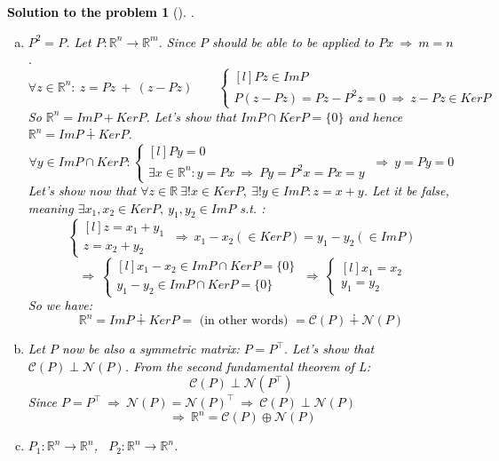 \documentclass[12pt,a4]{article}
\newtheorem{solution}{Solution to the problem}
\newcommand{\bR}{{\mathbb R}}
\renewcommand{\Im}{{\mathcal C}}
\newcommand{\Ker}{{\mathcal N}}
\begin{document}
\textcolor{black}{
\begin{solution}[]\rm .
\begin{enumerate}[(a)]
	\item $P^2 = P$. Let $P:\bR^n \to \bR^m$. Since $P$ should be able to be applied to $Px ~ \Rightarrow ~ m = n$.
\[
\forall z \in \bR^n:  ~ z = Pz ~+ ~(z - Pz)
\qquad
\left \{ \begin{matrix}[l]
Pz \in ImP\\
P(z - Pz) = Pz - P^2 z = 0 ~ \Rightarrow ~ z - Pz \in KerP
\end{matrix}\right. 
\]
So $\bR^n = ImP + KerP$. Let's show that $ImP \cap KerP = \{0\}$ and hence $\bR^n = ImP \dotplus KerP$.
\[
\forall y  \in ImP \cap KerP:
\left \{ \begin{matrix}[l]
Py = 0 \\[10pt]
\exists x \in \bR^n:
y = Px
~ \Rightarrow ~
Py = P^2x = Px = y
\end{matrix}\right. 
~ \Rightarrow ~ y = Py = 0
\]
Let's show now that
$\forall z \in \bR ~\exists!x \in KerP, ~\exists! y \in ImP: z = x + y$.
Let it be false, meaning $\exists x_1, x_2 \in KerP, ~ y_1, y_2 \in ImP$ s.t. :
\[
\left \{ \begin{matrix}[l]
z = x_1 + y_1 \\
z = x_2 + y_2
\end{matrix}\right. 
~ \Rightarrow ~
x_1 - x_2 (\in KerP) = y_1-y_2 (\in ImP)
\]
\[
~ \Rightarrow ~
\left \{ \begin{matrix}[l]
x_1 - x_2 \in ImP \cap KerP = \{0\} \\[10pt]
y_1 - y_2 \in ImP \cap KerP = \{0\}
\end{matrix}\right. 
~ \Rightarrow ~
\left \{ \begin{matrix}[l]
x_1 = x_2 \\[10pt]
y_1 = y_2
\end{matrix}\right. 
\]
So we have:
\[
\bR^n = ImP \dotplus KerP = \text{ (in other words) } = \mathcal{C}(P) \dotplus \mathcal{N}(P)
\]
	\item Let $P$ now be also a symmetric matrix: $P = P^\top$. Let's show that $\Im(P) \perp \Ker(P)$. From the second fundamental theorem of L:
\[
\Im(P) \perp \Ker(P^\top)
\]
Since $P = P^\top ~\Rightarrow~ \Ker(P) = \Ker(P)^\top ~\Rightarrow~ \Im(P) \perp \Ker(P)$
\[
~\Rightarrow~ \bR^n = \Im(P) \oplus  \Ker(P)
\]
\item $P_1:\bR^n \to \bR^n$, ~$P_2:\bR^n \to \bR^n$.
\[
\]
\end{enumerate}
\end{solution}}
\end{document}
